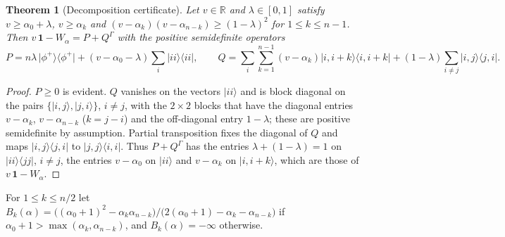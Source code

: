 \documentclass[10pt,a4paper]{article}
\newtheorem{theorem}{Theorem}
\newcommand{\ket}[1]{\lvert #1\rangle}
\newcommand{\ketbra}[2]{\lvert #1\rangle\langle #2\rvert}
\newcommand{\id}{\mathbf{1}}
\newcommand{\G}{\Gamma}
\begin{document}
\begin{theorem}[Decomposition certificate]\label{thm:cert}
Let $v\in\mathbb{R}$ and $\lambda\in[0,1]$ satisfy
$v\ge\alpha_0+\lambda$, $v\ge\alpha_k$ and
$(v-\alpha_k)(v-\alpha_{n-k})\ge(1-\lambda)^{2}$ for $1\le k\le n-1$.
Then $v\,\id-W_\alpha=P+Q^{\G}$ with the positive semidefinite operators
\begin{equation}\label{eq:PQ}
P=n\lambda\,\ketbra{\phi^+}{\phi^+}+(v-\alpha_0-\lambda)\sum_i\ketbra{ii}{ii},\qquad
Q=\sum_i\sum_{k=1}^{n-1}(v-\alpha_k)\ketbra{i,i+k}{i,i+k}
+(1-\lambda)\sum_{i\neq j}\ketbra{i,j}{j,i}.
\end{equation}
\end{theorem}
\begin{proof}
$P\ge0$ is evident. $Q$ vanishes on the vectors $\ket{ii}$ and is block diagonal on the
pairs $\{\ket{i,j},\ket{j,i}\}$, $i\neq j$, with the $2\times2$ blocks that have the
diagonal entries $v-\alpha_k$, $v-\alpha_{n-k}$ ($k=j-i$) and the off-diagonal entry
$1-\lambda$; these are positive semidefinite by assumption. Partial transposition fixes
the diagonal of $Q$ and maps $\ketbra{i,j}{j,i}$ to $\ketbra{j,j}{i,i}$. Thus $P+Q^{\G}$
has the entries $\lambda+(1-\lambda)=1$ on $\ketbra{ii}{jj}$, $i\neq j$, the entries
$v-\alpha_0$ on $\ket{ii}$ and $v-\alpha_k$ on $\ket{i,i+k}$, which are those of
$v\,\id-W_\alpha$.
\end{proof}

For $1\le k\le n/2$ let
$B_k(\alpha)=\bigl((\alpha_0+1)^{2}-\alpha_k\alpha_{n-k}\bigr)/\bigl(2(\alpha_0+1)-\alpha_k-\alpha_{n-k}\bigr)$
if $\alpha_0+1>\max(\alpha_k,\alpha_{n-k})$, and $B_k(\alpha)=-\infty$ otherwise.
\end{document}
